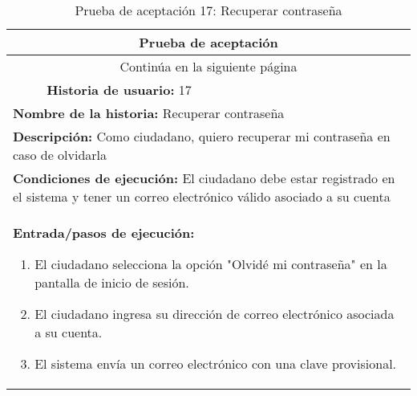 \begin{longtable}{|p{6.7cm}|p{6.7cm}|}
    \caption{Prueba de aceptación 17: Recuperar contraseña} \label{tab:prueba-17}                                                                                                                                                    \\
    \hline
    \multicolumn{2}{|c|}{\textbf{Prueba de aceptación}}                                                                                                                                                                              \\
    \hline
    \endfirsthead
    \hline
    \endhead
    \hline
    \multicolumn{2}{|c|}{{Continúa en la siguiente página}}                                                                                                                                                                          \\
    \hline
    \endfoot
    \hline
    \endlastfoot
    \multicolumn{1}{|p{6.7cm}|}{\textbf{Número} 17} & \multicolumn{1}{|p{6.7cm}|}{\textbf{Historia de usuario:} 17}                                                                                                                  \\
    \hline
    \multicolumn{2}{|p{13.4cm}|}{\textbf{Nombre de la historia:} Recuperar contraseña}                                                                                                                                               \\
    \hline
    \multicolumn{2}{|p{13.4cm}|}{\textbf{Descripción:} Como ciudadano, quiero recuperar mi contraseña en caso de olvidarla}                                                                                                          \\
    \hline
    \multicolumn{2}{|p{13.4cm}|}{\textbf{Condiciones de ejecución:} El ciudadano debe estar registrado en el sistema y tener un correo electrónico válido asociado a su cuenta}                                                      \\
    \hline
    \multicolumn{2}{|p{13.4cm}|}{\textbf{Entrada/pasos de ejecución:}
    \begin{enumerate}
        \item El ciudadano selecciona la opción "Olvidé mi contraseña" en la pantalla de inicio de sesión.
        \item El ciudadano ingresa su dirección de correo electrónico asociada a su cuenta.
        \item El sistema envía un correo electrónico con una clave provisional.

\end{enumerate}}
\end{longtable}
